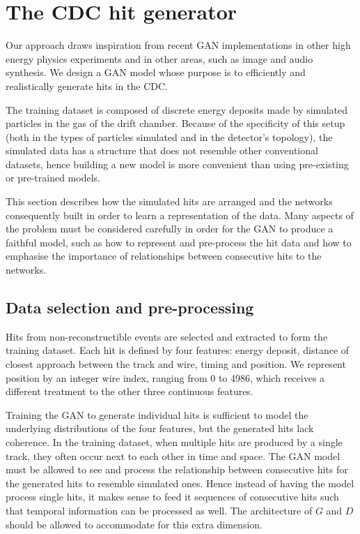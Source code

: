 \section{The CDC hit generator}
Our approach draws inspiration from recent GAN implementations in other high energy physics experiments and in other areas, such as image and audio synthesis. We design a GAN model whose purpose is to efficiently and realistically generate hits in the CDC. 

The training dataset is composed of discrete energy deposits made by simulated particles in the gas of the drift chamber. Because of the specificity of this setup (both in the types of particles simulated and in the detector's topology), the simulated data has a structure that does not resemble other conventional datasets, hence building a new model is more convenient than using pre-existing or pre-trained models.

This section describes how the simulated hits are arranged and the networks consequently built in order to learn a representation of the data. Many aspects of the problem must be considered carefully in order for the GAN to produce a faithful model, such as how to represent and pre-process the hit data and how to emphasise the importance of relationships between consecutive hits to the networks.


\subsection{Data selection and pre-processing}

Hits from non-reconstructible events are selected and extracted to form the training dataset. Each hit is defined by four features: energy deposit, distance of closest approach between the track and wire, timing and position. We represent position by an integer wire index, ranging from 0 to 4986, which receives a different treatment to the other three continuous features.

Training the GAN to generate individual hits is sufficient to model the underlying distributions of the four features, but the generated hits lack coherence. In the training dataset, when multiple hits are produced by a single track, they often occur next to each other in time and space. The GAN model must be allowed to see and process the relationship between consecutive hits for the generated hits to resemble simulated ones. Hence instead of having the model process single hits, it makes sense to feed it sequences of consecutive hits such that temporal information can be processed as well. The architecture of $G$ and $D$ should be allowed to accommodate for this extra dimension.



